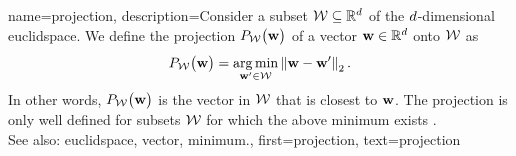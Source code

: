  {name={projection}, 
       description={Consider a subset $\mathcal{W} \subseteq \mathbb{R}^{d}$ of 
	   the $d$-dimensional \gls{euclidspace}. We define the projection $P_{\mathcal{W}}\big( {\bf w}\big)$
	   of a \gls{vector} ${\bf w} \in \mathbb{R}^{d}$ onto $\mathcal{W}$ as
	   \begin{equation} 
   	   	\nonumber
		\label{equ_def_proj_generic_dict}
  	    	P_{\mathcal{W}}\big( {\bf w}\big) = \operatorname*{arg\,min}_{{\bf w}' \in \mathcal{W}} \left\Vert {{\bf w}- {\bf w}'} \right\Vert_{2}. 
        	    \end{equation}
	    In other words, $P_{\mathcal{W}}\big( {\bf w}\big)$ is the \gls{vector} in $\mathcal{W}$ 
	    that is closest to ${\bf w}$. The projection is only well defined for subsets $\mathcal{W}$ 
	    for which the above \gls{minimum} exists \cite{BoydConvexBook}.
		 			\\ 
	    See also: \gls{euclidspace}, \gls{vector}, \gls{minimum}.},
	first={projection},
	text={projection}
}


